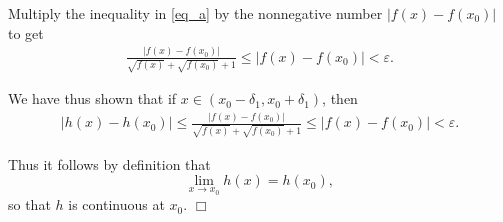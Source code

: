 \documentclass[9pt]{article}
\newcommand{\qed}{\hfill \ensuremath{\Box}}
\begin{document}
\begin{enumerate}
      Multiply the inequality in \eqref{eq_a} by the nonnegative number
      $|f(x) - f(x_0)|$ to get
      \begin{align*}
         \frac{|f(x) - f(x_0)|}{\sqrt{f(x)} + \sqrt{f(x_0)} + 1}
            \le |f(x) - f(x_0)| < \varepsilon.
      \end{align*}
      
      We have thus shown that if $x \in (x_0 - \delta_1, x_0 + \delta_1)$, then
      \begin{align*}
         |h(x) - h(x_0)| \le \frac{|f(x) - f(x_0)|}
            {\sqrt{f(x)} + \sqrt{f(x_0)} + 1} \le |f(x) - f(x_0)| < \varepsilon.
      \end{align*}
      
      Thus it follows by definition that
      $$\lim_{x\rightarrow x_0}h(x) = h(x_0),$$
      so that $h$ is continuous at $x_0$. \qed
\end{enumerate}
\end{document}
